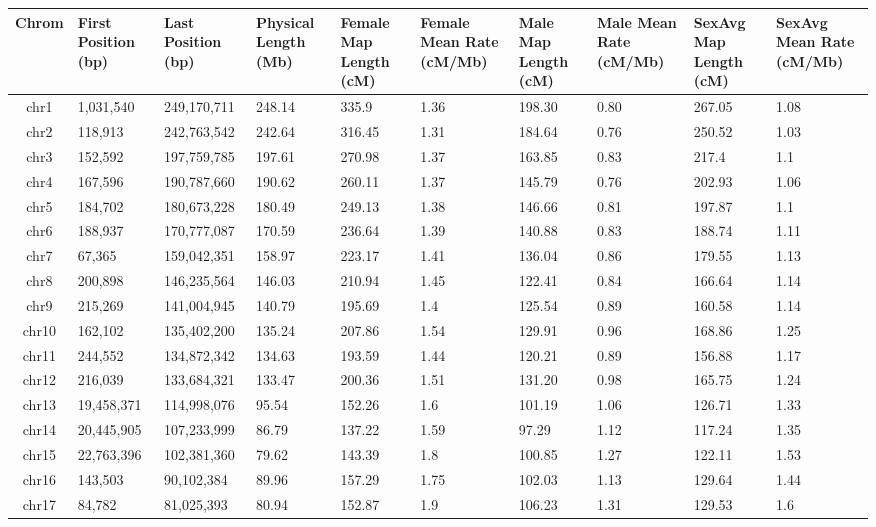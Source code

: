 \begin{table}[!h] \centering
    \footnotesize
    \begin{tabular}{|cp{1.2cm}p{1.4cm}p{1.1cm}p{1.1cm}p{1.0cm}p{1.1cm}p{1.0cm}p{1.1cm}p{1.0cm}|}
        \hline 
Chrom & First Position (bp) & Last Position (bp) & Physical Length (Mb) & Female Map Length (cM) & Female Mean Rate (cM/Mb) & Male Map Length (cM) & Male Mean Rate (cM/Mb) & SexAvg Map Length (cM) & SexAvg Mean Rate (cM/Mb) \\ \hline
chr1 & 1,031,540 & 249,170,711 & 248.14 & 335.9 & 1.36 & 198.30 & 0.80 & 267.05 & 1.08 \\
chr2 & 118,913 & 242,763,542 & 242.64 & 316.45 & 1.31 & 184.64 & 0.76 & 250.52 & 1.03 \\
chr3 & 152,592 & 197,759,785 & 197.61 & 270.98 & 1.37 & 163.85 & 0.83 & 217.4 & 1.1 \\
chr4 & 167,596 & 190,787,660 & 190.62 & 260.11 & 1.37 & 145.79 & 0.76 & 202.93 & 1.06 \\
chr5 & 184,702 & 180,673,228 & 180.49 & 249.13 & 1.38 & 146.66 & 0.81 & 197.87 & 1.1 \\
chr6 & 188,937 & 170,777,087 & 170.59 & 236.64 & 1.39 & 140.88 & 0.83 & 188.74 & 1.11 \\
chr7 & 67,365 & 159,042,351 & 158.97 & 223.17 & 1.41 & 136.04 & 0.86 & 179.55 & 1.13 \\
chr8 & 200,898 & 146,235,564 & 146.03 & 210.94 & 1.45 & 122.41 & 0.84 & 166.64 & 1.14 \\
chr9 & 215,269 & 141,004,945 & 140.79 & 195.69 & 1.4 & 125.54 & 0.89 & 160.58 & 1.14 \\
chr10 & 162,102 & 135,402,200 & 135.24 & 207.86 & 1.54 & 129.91 & 0.96 & 168.86 & 1.25 \\
chr11 & 244,552 & 134,872,342 & 134.63 & 193.59 & 1.44 & 120.21 & 0.89 & 156.88 & 1.17 \\
chr12 & 216,039 & 133,684,321 & 133.47 & 200.36 & 1.51 & 131.20 & 0.98 & 165.75 & 1.24 \\
chr13 & 19,458,371 & 114,998,076 & 95.54 & 152.26 & 1.6 & 101.19 & 1.06 & 126.71 & 1.33 \\
chr14 & 20,445,905 & 107,233,999 & 86.79 & 137.22 & 1.59 & 97.29 & 1.12 & 117.24 & 1.35 \\
chr15 & 22,763,396 & 102,381,360 & 79.62 & 143.39 & 1.8 & 100.85 & 1.27 & 122.11 & 1.53 \\
chr16 & 143,503 & 90,102,384 & 89.96 & 157.29 & 1.75 & 102.03 & 1.13 & 129.64 & 1.44 \\
chr17 & 84,782 & 81,025,393 & 80.94 & 152.87 & 1.9 & 106.23 & 1.31 & 129.53 & 1.6 \\

\end{tabular}
\end{table}
